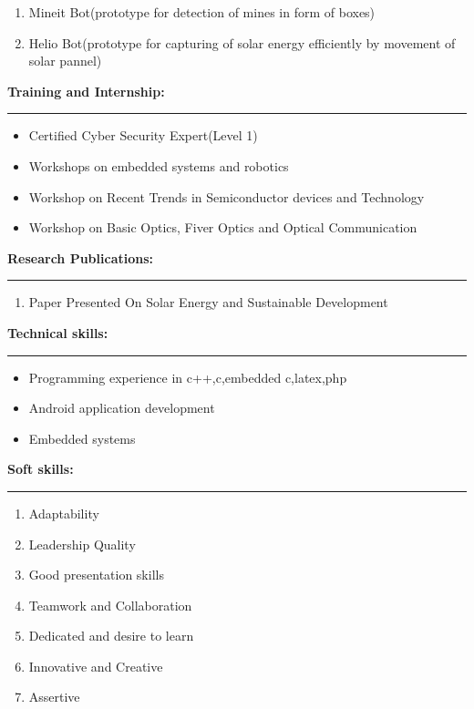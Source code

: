 \documentclass[a4paper,10pt]{article}
\begin{document}
\begin{flushleft}
\begin{enumerate}
      	\item  Mineit Bot(prototype for detection of mines in form of boxes)
      	\item  Helio Bot(prototype for capturing of solar energy efficiently by movement of solar pannel)
      \end{enumerate}
  \textbf{\large Training and Internship:}\\
  \hrule
   \begin{itemize}
   	\item  Certified Cyber Security Expert(Level 1) \\
   	\item  Workshops on embedded systems and robotics\\
   	\item  Workshop on Recent Trends in Semiconductor devices and Technology\\
   	\item  Workshop on Basic Optics, Fiver Optics and Optical Communication\\
   \end{itemize}
   \textbf{\large Research Publications:} \\ 
  \hrule
   \begin{enumerate}
   	\item  Paper Presented On Solar Energy and Sustainable Development \\
   \end{enumerate}
   \textbf{\large Technical skills:}\\
  \hrule
   \begin{itemize}
   	\item  Programming experience in c++,c,embedded c,latex,php \\
   	\item  Android application development\\
   	\item  Embedded systems\\
    \end{itemize}
     \newpage
  \textbf{\large Soft skills:}\\
  \hrule
    \begin{enumerate}
		\item Adaptability\\		
		\item Leadership Quality\\    	
    	\item Good presentation skills\\
    	\item Teamwork and Collaboration\\
    	\item Dedicated and desire to learn\\
    	\item Innovative and Creative\\
    	\item Assertive\\
    \end{enumerate}
\end{flushleft}
\end{document}
